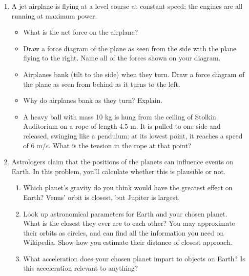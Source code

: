\documentclass[12pt]{article}
\begin{document}
\Large
\centerline{}
\normalsize
\centerline{}

\begin{enumerate}


\item A jet airplane is flying at a level course at constant speed; the engines are all running at maximum power. 

\begin{itemize}

\item What is the net force on the airplane?

\item Draw a force diagram of the plane as seen from the side with the plane
flying to the right. Name all of the forces shown on your diagram. 

\item Airplanes bank (tilt to the side) when they turn. Draw a force diagram of the 
plane as seen from behind as it turns to the left. 

\item Why do airplanes bank as they turn? Explain.

\item A heavy ball with mass 10 kg is hung from the ceiling of Stolkin Auditorium
on a rope of length 4.5 m. It is pulled to one side and released, swinging like
a pendulum; at its lowest point, it reaches a speed of 6 m/s. What is the tension
in the rope at that point?
\end{itemize}

  \item Astrologers claim that the positions of the planets can influence events on Earth. In this problem,
you'll calculate whether this is plausible or not.

\begin{enumerate}
\item Which planet's gravity do you think would have the greatest effect on Earth? Venus' orbit is closest,
but Jupiter is largest.
\item Look up astronomical parameters for Earth and your chosen planet. What is the closest they ever
are to each other? You may approximate their orbits as circles, and can find all the information you need
on Wikipedia. Show how you estimate their distance of closest approach.
\item What acceleration does your chosen planet impart to objects on Earth? Is this acceleration relevant 
to anything?
\end{enumerate}


\end{enumerate}
\end{document}
